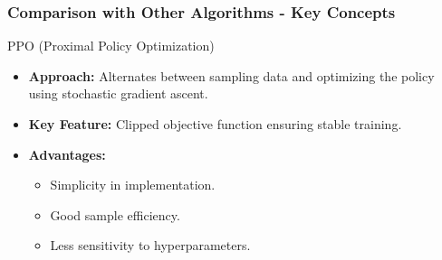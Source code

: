 \documentclass{beamer}
\begin{document}
\begin{frame}[fragile]
    \frametitle{Comparison with Other Algorithms - Key Concepts}
    \begin{block}{PPO (Proximal Policy Optimization)}
        \begin{itemize}
            \item \textbf{Approach:} Alternates between sampling data and optimizing the policy using stochastic gradient ascent.
            \item \textbf{Key Feature:} Clipped objective function ensuring stable training.
            \item \textbf{Advantages:}
                \begin{itemize}
                    \item Simplicity in implementation.
                    \item Good sample efficiency.
                    \item Less sensitivity to hyperparameters.
                \end{itemize}
        \end{itemize}
    \end{block}
\end{frame}
\end{document}
